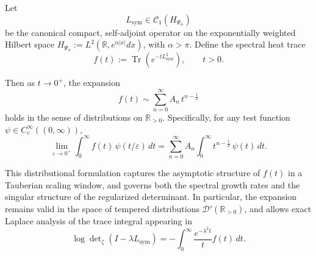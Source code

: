 \begin{lemma}
\label{lem:distributional_trace_asymptotics}
Let
\[
L_{\mathrm{sym}} \in \mathcal{C}_1(H_{\Psi_\alpha})
\]
be the canonical compact, self-adjoint operator on the exponentially weighted Hilbert space \( H_{\Psi_\alpha} := L^2(\mathbb{R}, e^{\alpha|x|} dx) \), with \( \alpha > \pi \). Define the spectral heat trace
\[
f(t) := \operatorname{Tr}(e^{-t L_{\mathrm{sym}}^2}), \qquad t > 0.
\]

Then as \( t \to 0^+ \), the expansion
\[
f(t) \sim \sum_{n=0}^\infty A_n \, t^{n - \frac{1}{2}}
\]
holds in the sense of distributions on \( \mathbb{R}_{>0} \). Specifically, for any test function \( \psi \in C_c^\infty((0, \infty)) \),
\[
\lim_{\varepsilon \to 0^+} \int_0^\infty f(t) \, \psi(t/\varepsilon) \, dt
= \sum_{n=0}^\infty A_n \int_0^\infty t^{n - \frac{1}{2}} \, \psi(t)\, dt.
\]

\medskip
\noindent
This distributional formulation captures the asymptotic structure of \( f(t) \) in a Tauberian scaling window, and governs both the spectral growth rates and the singular structure of the regularized determinant. In particular, the expansion remains valid in the space of tempered distributions \( \mathcal{D}'(\mathbb{R}_{>0}) \), and allows exact Laplace analysis of the trace integral appearing in
\[
\log \det\nolimits_{\zeta}(I - \lambda L_{\mathrm{sym}}) = - \int_0^\infty \frac{e^{-\lambda^2 t}}{t} f(t) \, dt.
\]
\end{lemma}
